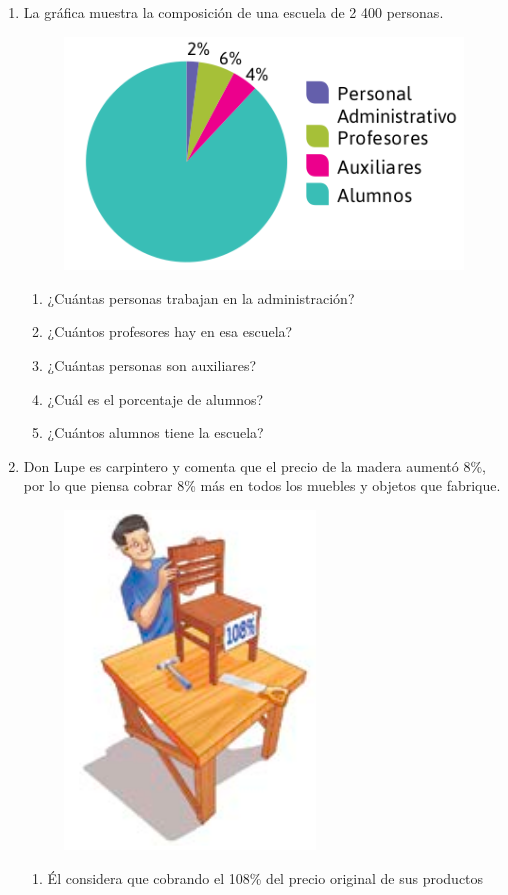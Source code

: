 \documentclass[11pt]{book}
\begin{document}
\begin{enumerate}
  \item La gráfica muestra la composición de una escuela de 2 400 personas.
        \begin{figure}[H]
          \centering
          \includegraphics[width=.5\linewidth]{escuela_pie.png}
          \label{fig:escuela_pie}
        \end{figure}
        \begin{enumerate}
          \item ¿Cuántas personas trabajan en la administración?
          \item ¿Cuántos profesores hay en esa escuela?
          \item ¿Cuántas personas son auxiliares?
          \item ¿Cuál es el porcentaje de alumnos?
          \item ¿Cuántos alumnos tiene la escuela?
        \end{enumerate}
  \item Don Lupe es carpintero y comenta que el precio de la madera aumentó 8\%, por lo
        que piensa cobrar 8\% más en todos los muebles y objetos que fabrique.
        \begin{figure}[H]
          \centering
          \includegraphics[width=.3\linewidth]{donLupe.png}
          \label{fig:donLupe}
        \end{figure}
        \begin{enumerate}
          \item Él considera que cobrando el 108\% del precio original de sus productos

\end{enumerate}
\end{enumerate}
\end{document}
